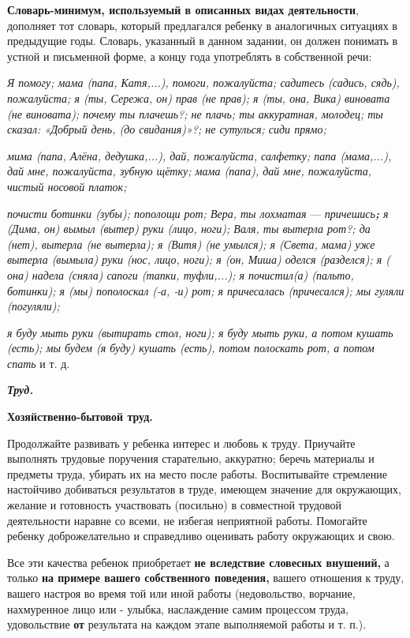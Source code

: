 \documentclass{book}
\renewcommand{\emph}[1]{\textit{#1}}
\begin{document}
\textbf{Словарь-минимум, используемый в описанных видах деятельности},
дополняет тот словарь, который предлагался ребенку в аналогичных
ситуациях в предыдущие годы. Словарь, указанный в данном задании, он
должен понимать в устной и письменной форме, а концу года употреблять в
собственной речи:

\emph{Я помогу; мама (папа, Катя,...), помоги, пожалуйста; садитесь
(садись, сядь), пожалуйста; я (ты, Сережа, он) прав (не прав); я (ты,
она, Вика) виновата (не виновата); почему ты плачешь?; не плачь; ты
аккуратная, молодец; ты сказал: «Добрый день, (до свидания)»?; не
сутулься; сиди прямо;}

\emph{мима (папа, Алёна, дедушка,...), дай, пожалуйста, салфетку; папа
(мама,...), дай мне, пожалуйста, зубную щётку; мама (папа), дай мне,
пожалуйста, чистый носовой платок;}

\emph{почисти ботинки (зубы); пополощи рот; Вера, ты лохматая} ---
\emph{причешись\textbf{;} я (Дима, он) вымыл (вытер) руки (лицо, ноги);
Валя, ты вытерла рот?; да (нет), вытерла (не вытерла); я (Витя) (не
умылся); я (Света, мама) уже вытерла (вымыла) руки (нос, лицо, ноги); я
(он, Миша) оделся (разделся); я ( она) надела (сняла) сапоги (тапки,
туфли,...); я почистил(а) (пальто, ботинки); я (мы) пополоскал (-а, -и)
рот; я причесалась (причесался); мы гуляли (погуляли);}

\emph{я буду мыть руки (вытирать стол, ноги); я буду мыть руки, а потом
кушать (есть); мы будем (я буду) кушать (есть), потом полоскать рот, а
потом спать} и т. д.

\emph{\textbf{Труд.}}

\textbf{Хозяйственно-бытовой труд.}

Продолжайте развивать у ребенка интерес и любовь к труду. Приучайте
выполнять трудовые поручения старательно, аккуратно; беречь материалы и
предметы труда, убирать их на место после работы. Воспитывайте
стремление настойчиво добиваться результатов в труде, имеющем значение
для окружающих, желание и готовность участвовать (посильно) в совместной
трудовой деятельности наравне со всеми, не избегая неприятной работы.
Помогайте ребенку доброжелательно и справедливо оценивать работу
окружающих и свою.

Все эти качества ребенок приобретает \textbf{не вследствие словесных
внушений,} а только \textbf{на примере вашего собственного поведения,}
вашего отношения к труду, вашего настроя во время той или иной работы
(недовольство, ворчание, нахмуренное лицо или - улыбка, наслаждение
самим процессом труда, удовольствие \textbf{от} результата на каждом
этапе выполняемой работы и т. п.).
\end{document}
